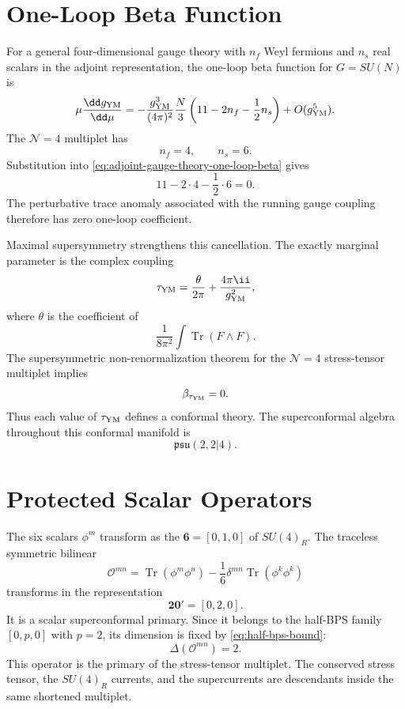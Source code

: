 \section{One-Loop Beta Function}

For a general four-dimensional gauge theory with \(n_f\) Weyl fermions and
\(n_s\) real scalars in the adjoint representation, the one-loop beta function
for \(G=SU(N)\) is
\begin{equation}
  \mu\frac{\dd g_{\rm YM}}{\dd\mu}
  =
  -\frac{g_{\rm YM}^3}{(4\pi)^2}
  \frac N3
  \left(11-2n_f-\frac12 n_s\right)
  +O(g_{\rm YM}^5).
  \label{eq:adjoint-gauge-theory-one-loop-beta}
\end{equation}
The \(\mathcal N=4\) multiplet has
\[
  n_f=4,
  \qquad
  n_s=6.
\]
Substitution into \eqref{eq:adjoint-gauge-theory-one-loop-beta} gives
\[
  11-2\cdot4-\frac12\cdot6=0.
\]
The perturbative trace anomaly associated with the running gauge coupling
therefore has zero one-loop coefficient.

Maximal supersymmetry strengthens this cancellation.  The exactly marginal
parameter is the complex coupling
\begin{equation}
  \tau_{\rm YM}
  =
  \frac{\theta}{2\pi}
  +
  \frac{4\pi\ii}{g_{\rm YM}^2},
  \label{eq:n4-complex-coupling}
\end{equation}
where \(\theta\) is the coefficient of
\[
  \frac1{8\pi^2}\int \operatorname{Tr}(F\wedge F).
\]
The supersymmetric non-renormalization theorem for the \(\mathcal N=4\)
stress-tensor multiplet implies
\[
  \beta_{\tau_{\rm YM}}=0.
\]
Thus each value of \(\tau_{\rm YM}\) defines a conformal theory.  The
superconformal algebra throughout this conformal manifold is
\[
  \mathfrak{psu}(2,2|4).
\]

\section{Protected Scalar Operators}

The six scalars \(\phi^m\) transform as the \(\mathbf6=[0,1,0]\) of
\(SU(4)_R\).  The traceless symmetric bilinear
\begin{equation}
  \mathcal O^{mn}
  =
  \operatorname{Tr}(\phi^m\phi^n)
  -
  \frac16\delta^{mn}
  \operatorname{Tr}(\phi^k\phi^k)
  \label{eq:n4-stress-tensor-multiplet-primary}
\end{equation}
transforms in the representation
\[
  \mathbf{20}'=[0,2,0].
\]
It is a scalar superconformal primary.  Since it belongs to the half-BPS
family \([0,p,0]\) with \(p=2\), its dimension is fixed by
\eqref{eq:half-bps-bound}:
\[
  \Delta(\mathcal O^{mn})=2.
\]
This operator is the primary of the stress-tensor multiplet.  The conserved
stress tensor, the \(SU(4)_R\) currents, and the supercurrents are descendants
inside the same shortened multiplet.

